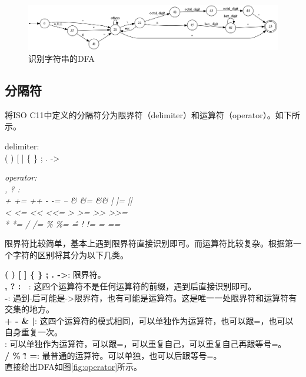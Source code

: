 \documentclass[UTF8, twoside, titlepage]{ctexart}
\newenvironment{lex}
{
	\linespread{1.2}
	\leftskip=2.5cm
	\rightskip=2.5cm
	\itshape
	\setlength{\parindent}{-1cm}
}
{\par}
\begin{document}
\begin{figure}[htbp]
	\centering
	\includegraphics[width=\textwidth]{images/string2.png}
	\caption{识别字符串的DFA}
	\label{fig:string2}
\end{figure}

\subsection{分隔符}
将ISO C11中定义的分隔符分为限界符（delimiter）和运算符（operator）。如下所示。

\begin{lex}
delimiter: \\
{
	\normalfont
	\ttfamily
	( ) [ ] \{ \} ; . ->
}

\itshape
operator: \\
{
	\normalfont
	\ttfamily
	, ? : ~ \\
	+ += ++ - -= -- \& \&= \&\& | |= || \\
	< <= << <<= > >= >> >>= \\
	* *= / /= \% \%= \^ \^= ! != = ==
}
\end{lex}

限界符比较简单，基本上遇到限界符直接识别即可。而运算符比较复杂。根据第一个字符的区别将其分为以下几类。

\noindent
\textbf{\ttfamily ( ) [ ] \{ \} ; . ->}: 限界符。\\
\textbf{\ttfamily , ? : ~}: 这四个运算符不是任何运算符的前缀，遇到后直接识别即可。\\
\textbf{\ttfamily -}: 遇到-后可能是->限界符，也有可能是运算符。这是唯一一处限界符和运算符有交集的地方。\\
\textbf{\ttfamily + - \& |}: 这四个运算符的模式相同，可以单独作为运算符，也可以跟=，也可以自身重复一次。\\
\textbf{\ttfamily < >}: 可以单独作为运算符，可以跟=，可以重复自己，可以重复自己再跟等号=。\\
\textbf{\ttfamily * / \% \^ ! =}: 最普通的运算符。可以单独，也可以后跟等号=。\\

直接给出DFA如图\ref{fig:operator}所示。
\end{document}
